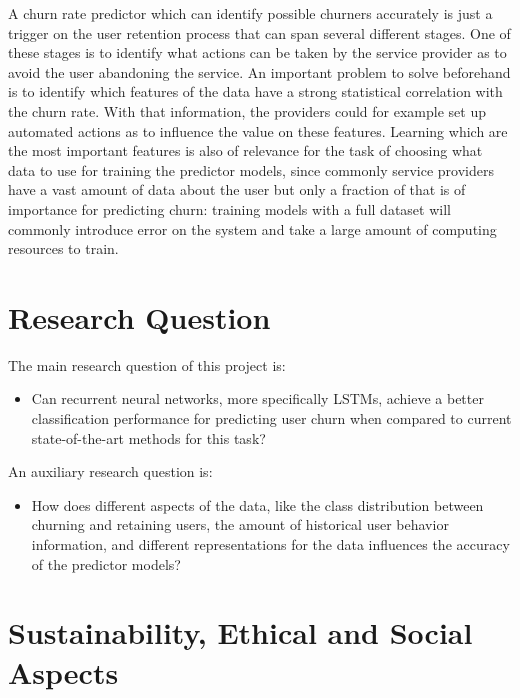 \documentclass{kththesis}
\begin{document}
A churn rate predictor which can identify possible churners accurately is just a trigger on the user retention process that can span several different stages. One of these stages is to identify what actions can be taken by the service provider as to avoid the user abandoning the service. An important problem to solve beforehand is to identify which features of the data have a strong statistical correlation with the churn rate. With that information, the providers could for example set up automated actions as to influence the value on these features. Learning which are the most important features is also of relevance for the task of choosing what data to use for training the predictor models, since commonly service providers have a vast amount of data about the user but only a fraction of that is of importance for predicting churn: training models with a full dataset will commonly introduce error on the system and take a large amount of computing resources to train.
	
\section{Research Question}	
	
The main research question of this project is:

\begin{itemize}
\item Can recurrent neural networks, more specifically LSTMs, achieve a better classification performance for predicting user churn when compared to current state-of-the-art methods for this task?
\end{itemize}	

An auxiliary research question is:

\begin{itemize}
\item How does different aspects of the data, like the class distribution between churning and retaining users, the amount of historical user behavior information, and different representations for the data influences the accuracy of the predictor models?
\end{itemize}


\section{Sustainability, Ethical and Social Aspects}
\end{document}
